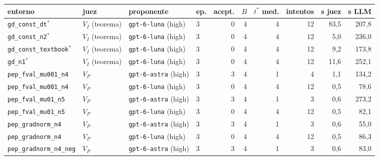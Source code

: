 \documentclass[11pt,a4paper]{article}
\begin{document}
\begin{table}[!ht]
\centering
\scriptsize
\setlength{\tabcolsep}{4pt}
\begin{tabular}{@{}llllrrrrrr@{}}
\toprule
entorno & juez & proponente & ep. & acept. & $B$ & $t^*$ med. & intentos & s juez & s LLM \\
\midrule
\texttt{gd\_\allowbreak{}const\_\allowbreak{}dt}$^\ast$ & $V_I$ (teorema) & \texttt{gpt-\allowbreak{}6-\allowbreak{}luna} (high) & 3 & 0 & 4 & 4 & 12 & 83{,}5 & 207{,}8 \\
\texttt{gd\_\allowbreak{}const\_\allowbreak{}n2}$^\ast$ & $V_I$ (teorema) & \texttt{gpt-\allowbreak{}6-\allowbreak{}luna} (high) & 3 & 0 & 4 & 4 & 12 & 5{,}0 & 236{,}0 \\
\texttt{gd\_\allowbreak{}const\_\allowbreak{}textbook}$^\ast$ & $V_I$ (teorema) & \texttt{gpt-\allowbreak{}6-\allowbreak{}luna} (high) & 3 & 0 & 4 & 4 & 12 & 9{,}2 & 173{,}8 \\
\texttt{gd\_\allowbreak{}n1}$^\ast$ & $V_I$ (teorema) & \texttt{gpt-\allowbreak{}6-\allowbreak{}luna} (high) & 3 & 0 & 4 & 4 & 12 & 11{,}6 & 252{,}1 \\
\texttt{pep\_\allowbreak{}fval\_\allowbreak{}mu001\_\allowbreak{}n4} & $V_P$ & \texttt{gpt-\allowbreak{}6-\allowbreak{}astra} (high) & 3 & 3 & 4 & 1 & 4 & 1{,}1 & 134{,}2 \\
\texttt{pep\_\allowbreak{}fval\_\allowbreak{}mu001\_\allowbreak{}n4} & $V_P$ & \texttt{gpt-\allowbreak{}6-\allowbreak{}luna} (high) & 3 & 0 & 4 & 4 & 12 & 0{,}5 & 78{,}6 \\
\texttt{pep\_\allowbreak{}fval\_\allowbreak{}mu01\_\allowbreak{}n5} & $V_P$ & \texttt{gpt-\allowbreak{}6-\allowbreak{}astra} (high) & 3 & 3 & 4 & 1 & 3 & 0{,}6 & 273{,}2 \\
\texttt{pep\_\allowbreak{}fval\_\allowbreak{}mu01\_\allowbreak{}n5} & $V_P$ & \texttt{gpt-\allowbreak{}6-\allowbreak{}luna} (high) & 3 & 0 & 4 & 4 & 12 & 0{,}5 & 82{,}1 \\
\texttt{pep\_\allowbreak{}gradnorm\_\allowbreak{}n4} & $V_P$ & \texttt{gpt-\allowbreak{}6-\allowbreak{}astra} (high) & 3 & 3 & 4 & 1 & 3 & 0{,}6 & 55{,}0 \\
\texttt{pep\_\allowbreak{}gradnorm\_\allowbreak{}n4} & $V_P$ & \texttt{gpt-\allowbreak{}6-\allowbreak{}luna} (high) & 3 & 0 & 4 & 4 & 12 & 0{,}5 & 86{,}3 \\
\texttt{pep\_\allowbreak{}gradnorm\_\allowbreak{}n4\_\allowbreak{}neg} & $V_P$ & \texttt{gpt-\allowbreak{}6-\allowbreak{}astra} (high) & 3 & 3 & 4 & 1 & 3 & 0{,}6 & 83{,}0 \\

\end{tabular}
\end{table}
\end{document}
